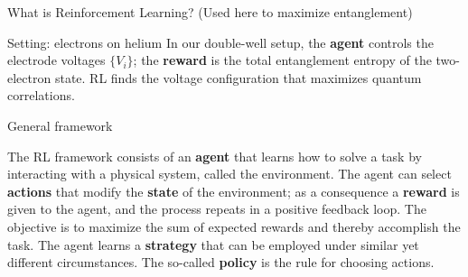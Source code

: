 \documentclass[aspectratio=169,10pt]{beamer}
\begin{document}
\begin{frame}{What is Reinforcement Learning? (Used here to maximize entanglement)}
\begin{block}{Setting: electrons on helium}
In our double-well setup, the \textbf{agent} controls the electrode voltages $\{V_i\}$; the \textbf{reward} is the total entanglement entropy of the two-electron state. RL finds the voltage configuration that maximizes quantum correlations.
\end{block}

\begin{block}{General framework}  

The RL framework consists of an {\bf agent} that learns how to solve a
task by interacting with a physical system, called the
environment. The agent can select {\bf actions} that modify the {\bf
  state} of the environment; as a consequence a {\bf reward} is given
to the agent, and the process repeats in a positive feedback loop. The
objective is to maximize the sum of expected rewards and thereby
accomplish the task. The agent learns a {\bf strategy} that can be
employed under similar yet different circumstances. The so-called {\bf
  policy} is the rule for choosing actions.

\end{block}
\end{frame}
\end{document}
